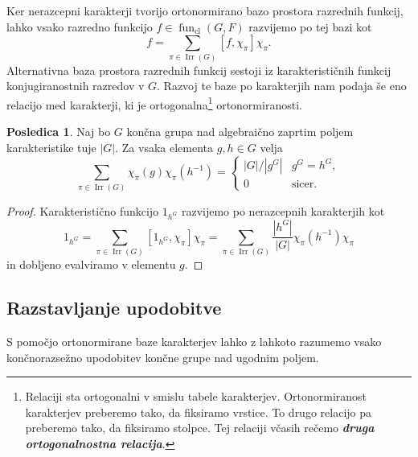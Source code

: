 \documentclass[11pt]{book}
\DeclareMathOperator\Irr{Irr}
\DeclareMathOperator\cl{cl}
\DeclareMathOperator\fun{fun}
\def\definicija{\color{rdeca}\bf\em}
\theoremstyle{definition}
\theoremstyle{zgled}
\theoremstyle{odprtproblem}
\theoremstyle{domacanaloga}
\newenvironment{dokaz}
    {\color{siva}\begin{proof}}
    {\end{proof}}
\theoremstyle{izrek}
\newtheorem*{posledica}{Posledica}
\begin{document}
Ker nerazcepni karakterji tvorijo ortonormirano bazo prostora razrednih funkcij, lahko vsako razredno funkcijo $f \in \fun_{\cl}(G,F)$ razvijemo po tej bazi kot
\[
    f = \sum_{\pi \in \Irr(G)} [ f, \chi_{\pi} ] \chi_{\pi}.
\]
Alternativna baza prostora razrednih funkcij sestoji iz karakterističnih funkcij konjugiranostnih razredov v $G$. Razvoj te baze po karakterjih nam podaja še eno relacijo med karakterji, ki je ortogonalna\footnote{Relaciji sta ortogonalni v smislu tabele karakterjev. Ortonormiranost karakterjev preberemo tako, da fiksiramo vrstice. To drugo relacijo pa preberemo tako, da fiksiramo stolpce. Tej relaciji včasih rečemo {\definicija druga ortogonalnostna relacija}.} ortonormiranosti.

\begin{posledica}
Naj bo $G$ končna grupa nad algebraično zaprtim poljem karakteristike tuje $|G|$. Za vsaka elementa $g,h \in G$ velja
\[
    \sum_{\pi \in \Irr(G)} \chi_{\pi}(g) \chi_{\pi}(h^{-1}) = \begin{cases}
        |G|/|g^G| & g^G = h^G, \\
        0 & \text{sicer.}
    \end{cases}
\]
\end{posledica}
\begin{dokaz}
Karakteristično funkcijo $1_{h^G}$ razvijemo po nerazcepnih karakterjih kot
\[
    1_{h^G} = \sum_{\pi \in \Irr(G)} [ 1_{h^G}, \chi_{\pi} ] \chi_{\pi}
    = \sum_{\pi \in \Irr(G)} \frac{|h^G|}{|G|} \chi_{\pi}(h^{-1}) \chi_{\pi}
\]
in dobljeno evalviramo v elementu $g$.
\end{dokaz}

\subsection{Razstavljanje upodobitve}

S pomočjo ortonormirane baze karakterjev lahko z lahkoto razumemo vsako končnorazsežno upodobitev končne grupe nad ugodnim poljem.
\end{document}
